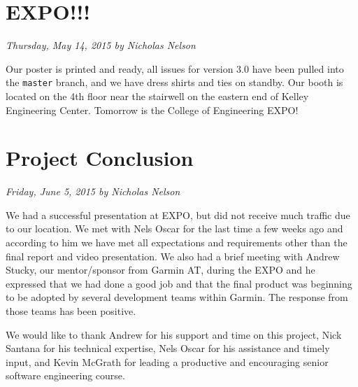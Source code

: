 \documentclass[11pt]{scrreprt}
\begin{document}
\section{EXPO!!!}
\textit{Thursday, May 14, 2015 by Nicholas Nelson}
\newline

Our poster is printed and ready, all issues for version 3.0 have been pulled into the \texttt{master} branch, and we have dress shirts and ties on standby. Our booth is located on the 4th floor near the stairwell on the eastern end of Kelley Engineering Center. Tomorrow is the College of Engineering EXPO!

\section{Project Conclusion}
\textit{Friday, June 5, 2015 by Nicholas Nelson}
\newline

We had a successful presentation at EXPO, but did not receive much traffic due to our location. We met with Nels Oscar for the last time a few weeks ago and according to him we have met all expectations and requirements other than the final report and video presentation. We also had a brief meeting with Andrew Stucky, our mentor/sponsor from Garmin AT, during the EXPO and he expressed that we had done a good job and that the final product was beginning to be adopted by several development teams within Garmin. The response from those teams has been positive.

We would like to thank Andrew for his support and time on this project, Nick Santana for his technical expertise, Nels Oscar for his assistance and timely input, and Kevin McGrath for leading a productive and encouraging senior software engineering course.
\end{document}
